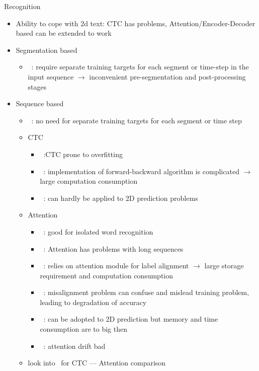 Recognition
\begin{itemize}
    \item Ability to cope with 2d text:
        CTC has problems,
        Attention/Encoder-Decoder based can be extended to work
    \item Segmentation based
        \begin{itemize}
            \item~\cite{xie_aggregation_2019}: require separate training targets for each segment
                or time-step in the input sequence $\rightarrow$ inconvenient pre-segmentation and
                post-processing stages
        \end{itemize}
    \item Sequence based
        \begin{itemize}
            \item~\cite{xie_aggregation_2019}: no need for separate training targets for each segment
                or time step
            \item CTC
                \begin{itemize}
                    \item~\cite{chen_text_2021}:CTC prone to overfitting
                    \item~\cite{xie_aggregation_2019}: implementation of forward-backward algorithm
                        is complicated $\rightarrow$ large computation consumption
                    \item~\cite{xie_aggregation_2019}: can hardly be applied to 2D prediction
                        problems
                \end{itemize}
            \item Attention
                \begin{itemize}
                    \item~\cite{chen_text_2021}: good for isolated word recognition
                    \item~\cite{chen_text_2021}: Attention has problems with long sequences
                    \item~\cite{xie_aggregation_2019}: relies on attention module for label alignment
                        $\rightarrow$ large storage requirement and computation consumption
                    \item~\cite{xie_aggregation_2019}: misalignment problem can confuse and mislead
                        training problem, leading to degradation of accuracy
                    \item~\cite{xie_aggregation_2019}: can be adopted to 2D prediction but
                        memory and time consumption are to big then
                    \item~\cite{cheng_focusing_2017}: attention drift bad
                \end{itemize}
            \item look into~\cite{cong_comparative_2019} for CTC --- Attention comparison
        \end{itemize}
\end{itemize}

